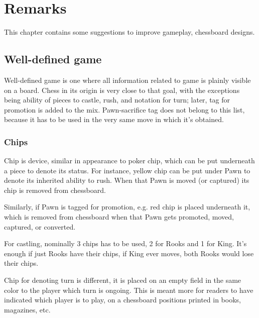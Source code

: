 

\chapter*{Remarks}
\label{ch:Remarks}

This chapter contains some suggestions to improve gameplay, chessboard
designs.

\section*{Well-defined game}
\label{sec:Remarks/Well-defined game}

Well-defined game is one where all information related to game is plainly
visible on a board. Chess in its origin is very close to that goal, with
the exceptions being ability of pieces to castle, rush, and notation for
turn; later, tag for promotion is added to the mix. Pawn-sacrifice tag
does not belong to this list, because it has to be used in the very same
move in which it's obtained.

\subsection*{Chips}
\label{sec:Remarks/Well-defined game/Chips}

Chip is device, similar in appearance to poker chip, which can be put
underneath a piece to denote its status. For instance, yellow chip can be
put under Pawn to denote its inherited ability to rush. When that Pawn is
moved (or captured) its chip is removed from chessboard.

Similarly, if Pawn is tagged for promotion, e.g. red chip is placed
underneath it, which is removed from chessboard when that Pawn gets promoted,
moved, captured, or converted.

For castling, nominally 3 chips has to be used, 2 for Rooks and 1 for King.
It's enough if just Rooks have their chips, if King ever moves, both Rooks
would lose their chips.

Chip for denoting turn is different, it is placed on an empty field in the
same color to the player which turn is ongoing. This is meant more for
readers to have indicated which player is to play, on a chessboard positions
printed in books, magazines, etc.

